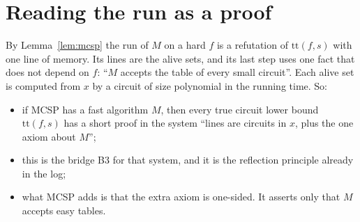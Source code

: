 \documentclass[11pt]{article}
\begin{document}
\section{Reading the run as a proof}\label{sec:ps}
By Lemma~\ref{lem:mcsp} the run of $M$ on a hard $f$ is a refutation of $\mathrm{tt}(f,s)$ with one line of memory. Its lines are the alive sets, and its last step uses one fact that does not depend on $f$: ``$M$ accepts the table of every small circuit''. Each alive set is computed from $x$ by a circuit of size polynomial in the running time. So:
\begin{itemize}
\item if MCSP has a fast algorithm $M$, then every true circuit lower bound $\mathrm{tt}(f,s)$ has a short proof in the system ``lines are circuits in $x$, plus the one axiom about $M$'';
\item this is the bridge B3 for that system, and it is the reflection principle already in the log;
\item what MCSP adds is that the extra axiom is one-sided. It asserts only that $M$ accepts easy tables.
\end{itemize}
\end{document}
